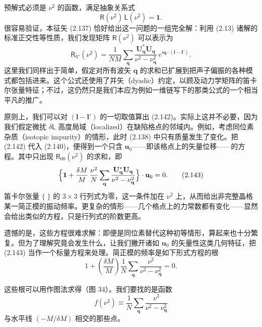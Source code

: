 预解式必须是 $\nu^2$ 的函数，满足抽象关系式
\begin{equation*}
\mathsf{R}(\nu^2)\,\mathsf{L}(\nu^2)=\mathbf{1}.
\tag{2.141}
\end{equation*}
很容易验证，本征矢 (2.137) 恰好给出这一问题的一组完全解：利用 (2.13) 诸解的标准正交性等性质，我们发现矩阵 $\mathsf{R}(\nu^2)$ 可以表示为
\begin{equation*}
\mathsf{R}_{ll'}(\nu^2)=\frac{1}{NM}\sum_{\mathbf{q}}\frac{\mathbf{U}^{*}_{\mathbf{q}}\mathbf{U}_{\mathbf{q}}}{\nu^2-\nu^2_{\mathbf{q}}}\,e^{i\mathbf{q}\cdot(\mathbf{l}-\mathbf{l}')}.
\tag{2.142}
\end{equation*}
这里我们同样出于简单，假定对所有波矢 $\mathbf{q}$ 的求和已扩展到把声子偏振的各种模式都包括进来。这个公式还使用了并矢（dyadic）约定，以顾及动力学矩阵的笛卡尔张量特征；不过，这仍然只是我们本应为例如一维链写下的那类公式的一个相当平凡的推广。

原则上，我们可以对 $(\mathbf{l}-\mathbf{l}')$ 的一切取值算出 (2.142)。实际上这并不必要，因为我们假定微扰 $\delta\mathsf{L}$ 高度局域（localized）在缺陷格点的邻域内。例如，考虑同位素杂质（isotopic impurity）的情形，此时 (2.138) 中只有质量发生了变化。把 (2.142) 代入 (2.140)，便得到一个只含 $\mathbf{u}_0$——即该格点上的矢量位移——的方程。其中只出现 $\mathsf{R}_{00}(\nu^2)$ 的求和，即
\begin{equation*}
\Bigl\{\mathbf{1}+\frac{\delta M}{M}\,\frac{\nu^2}{N}\sum_{\mathbf{q}}\frac{\mathbf{U}^{*}_{\mathbf{q}}\mathbf{U}_{\mathbf{q}}}{\nu^2-\nu^2_{\mathbf{q}}}\Bigr\}\cdot\mathbf{u}_0=0.
\tag{2.143}
\end{equation*}
笛卡尔张量 $\{\;\}$ 的 $3\times3$ 行列式为零，这一条件加在 $\nu^2$ 上，从而给出非完整晶格某一简正模的振动频率。更复杂的情形——几个格点上的力常数都有变化——显然会给出类似的方程，只是行列式的阶数更高。

遗憾的是，这些方程很难求解：即便是同位素替代这种初等情形，算起来也十分繁复。但为了理解究竟会发生什么，让我们撇开诸如 $\mathbf{u}_0$ 的矢量性这类几何特征，把 (2.143) 当作一个标量方程来处理。简正模的频率是如下形式方程的根
\begin{equation*}
1+\left(\frac{\delta M}{M}\right)\frac{1}{N}\sum_{\mathbf{q}}\frac{\nu^2}{\nu^2-\nu^2_{\mathbf{q}}}=0.
\tag{2.144}
\end{equation*}


这些根可以用作图法求得（图 34）。我们要找的是函数
\begin{equation*}
f(\nu^2)\equiv\frac{1}{N}\sum_{\mathbf{q}}\frac{\nu^2}{\nu^2-\nu^2_{\mathbf{q}}}
\tag{2.145}
\end{equation*}
与水平线 $(-M/\delta M)$ 相交的那些点。

